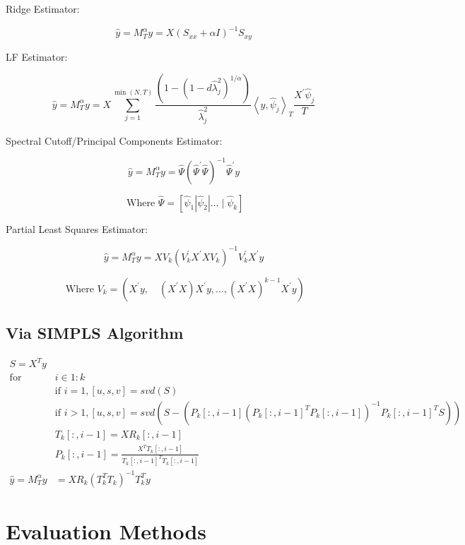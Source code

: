 Ridge Estimator:

\[\widehat{y} = M_{T}^{\alpha} y = X (S_{xx} + \alpha I)^{-1} S_{xy}\]

LF Estimator:

\[\widehat{y} = M_{T}^{\alpha} y = X \sum_{j=1}^{\min (N, T)} \frac{\left(1-\left(1-d \widehat{\lambda}_{j}^{2}\right)^{1 / \alpha}\right)}{\widehat{\lambda}_{j}^{2}}\left\langle y, \hat{\psi}_{j}\right\rangle_{T} \frac{X^{\prime} \hat{\psi}_{j}}{T}\]

Spectral Cutoff/Principal Components Estimator:

\[\widehat{y} = M_{T}^{\alpha} y = \widehat{\Psi} \left(\widehat{\Psi}^{\prime} \widehat{\Psi}\right)^{-1} \widehat{\Psi}^{\prime} y\]

\[\text{ Where } \widehat{\Psi} = \left[\widehat{\psi}_{1}\left|\widehat{\psi}_{2}\right| \ldots \mid \widehat{\psi}_{k}\right]\]

Partial Least Squares Estimator:

\[\widehat{y} = M_{T}^{\alpha} y = X V_{k}\left(V_{k}^{\prime} X^{\prime} X V_{k}\right)^{-1} V_{k}^{\prime} X^{\prime} y\]

\[\text{ Where } V_{k}=\left(X^{\prime} y, \quad\left(X^{\prime} X\right) X^{\prime} y, \ldots,\left(X^{\prime} X\right)^{k-1} X^{\prime} y\right)\]

\subsection{Via SIMPLS Algorithm}

\begin{align}
\nonumber S = X^{T} y & \\
\nonumber \text{for } & i \in 1:k \\
\nonumber &\text{if } i = 1, [u, s, v] = svd(S) \\
\nonumber &\text{if } i > 1, [u, s, v] = svd(S - (P_{k}[:, i-1](P_{k}[:, i-1]^{T} P_{k}[:, i-1])^{-1} P_{k}[:, i-1]^{T} S)) \\
\nonumber &T_{k}[:, i - 1] = X R_{k}[:, i - 1] \\
\nonumber &P_{k}[:, i - 1] = \frac{X^{T} T_{k}[:, i - 1]}{T_{k}[:, i - 1]^{T}T_{k}[:, i - 1]} \\
\nonumber \widehat{y} = M^{\alpha}_{T} y &= X R_{k} (T^{T}_{k} T_{k})^{-1} T^{T}_{k} y
\end{align}

\section{Evaluation Methods}

